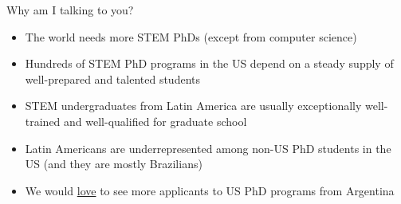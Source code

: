 \begin{frame}[fragile]{Why am I talking to you?}

\begin{itemize}
    \item The world needs more STEM PhDs (except from computer science) 
    \item Hundreds of STEM PhD programs in the US depend on a steady supply of well-prepared and talented students
    \item STEM undergraduates from Latin America are usually exceptionally well-trained and well-qualified for graduate school
    \item Latin Americans are underrepresented among non-US PhD students in the US (and they are mostly Brazilians)
    \item We would \ul{love} to see more applicants to US PhD programs from Argentina
\end{itemize}
\end{frame}

